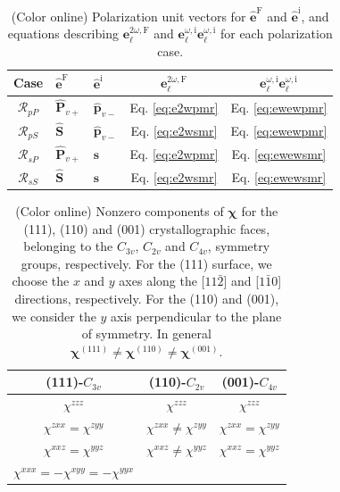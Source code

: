 \documentclass[aps,prb,10pt,showpacs,letterpaper,twocolumn]{revtex4-1}
\begin{document}
\begin{table}[t]
\caption{(Color online) Polarization unit vectors for
$\hat{\mathbf{e}}^{\mathrm{F}}$ and $\hat{\mathbf{e}}^{\mathrm{i}}$, and
equations describing $\mathbf{e}^{2\omega,\mathrm{F}}_{\ell}$ and
$\mathbf{e}^{\omega,\mathrm{i}}_{\ell}\mathbf{e}^{\omega,\mathrm{i}}_{\ell}$ for
each polarization case.}
\label{tab:summary}
\centering
\begin{tabular}{| c | l | l | c | c |}
\hline
Case               & $\hat{\mathbf{e}}^{\mathrm{F}}$
                   & $\hat{\mathbf{e}}^{\mathrm{i}}$
                   & $\mathbf{e}^{2\omega,\mathrm{F}}_{\ell}$
                   & $\mathbf{e}^{\omega,\mathrm{i}}_{\ell}
                      \mathbf{e}^{\omega,\mathrm{i}}_{\ell}$ \\
\hline
$\mathcal{R}_{pP}$ & $\hat{\mathbf{P}}_{v+}$
                   & $\hat{\mathbf{p}}_{v-}$
                   &  Eq. \eqref{eq:e2wpmr} & Eq. \eqref{eq:ewewpmr} \\
$\mathcal{R}_{pS}$ & $\hat{\mathbf{S}}$
                   & $\hat{\mathbf{p}}_{v-}$
                   &  Eq. \eqref{eq:e2wsmr} & Eq. \eqref{eq:ewewpmr} \\
$\mathcal{R}_{sP}$ & $\hat{\mathbf{P}}_{v+}$
                   & $\hat{\mathbf{s}}$
                   &  Eq. \eqref{eq:e2wpmr} & Eq. \eqref{eq:ewewsmr} \\
$\mathcal{R}_{sS}$ & $\hat{\mathbf{S}}$
                   & $\hat{\mathbf{s}}$
                   &  Eq. \eqref{eq:e2wsmr} & Eq. \eqref{eq:ewewsmr} \\
\hline
\end{tabular}
\end{table}


\begin{table}[t]
\caption{(Color online) Nonzero components of $\boldsymbol{\chi}$ for the (111),
(110) and (001) crystallographic faces, belonging to the $C_{3v}$, $C_{2v}$ and
$C_{4v}$, symmetry groups, respectively. For the (111) surface, we choose the
$x$ and $y$ axes along the [$11\bar{2}$] and [$1\bar{1}0$] directions,
respectively. For the (110) and (001), we consider the $y$ axis perpendicular to
the plane of symmetry.\cite{sipePRB87} In general $\boldsymbol{\chi}^{(111)}\ne
\boldsymbol{\chi}^{(110)} \ne \boldsymbol{\chi}^{(001)}$.}
\label{tab:chis}
\centering
\begin{tabular}{| c | c | c |}
\hline 
(111)-$C_{3v}$          & (110)-$C_{2v}$            & (001)-$C_{4v}$ \\
\hline 
$\chi^{zzz}$            & $\chi^{zzz}$              & $\chi^{zzz}$\\
$\chi^{zxx}=\chi^{zyy}$ & $\chi^{zxx}\ne\chi^{zyy}$ & $\chi^{zxx}=\chi^{zyy}$\\
$\chi^{xxz}=\chi^{yyz}$ & $\chi^{xxz}\ne\chi^{yyz}$ & $\chi^{xxz}=\chi^{yyz}$\\
$\chi^{xxx}=-\chi^{xyy}=-\chi^{yyx}$ &              &  \\
\hline 
\end{tabular}
\end{table}
\end{document}
